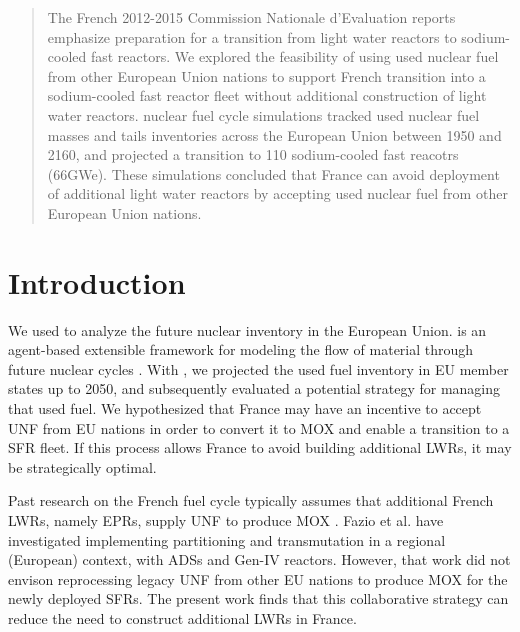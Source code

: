 \begin{abstract}
        The French 2012-2015 Commission Nationale d'Evaluation reports 
        \cite{noauthor_cne2_nodate} emphasize preparation for a transition from 
        light water reactors to sodium-cooled fast reactors.  We explored the 
        feasibility of using used nuclear fuel from other European Union 
        nations to support French transition into a sodium-cooled fast reactor 
        fleet without additional construction of light water reactors. \Cyclus 
        nuclear fuel cycle simulations tracked used nuclear fuel masses and tails 
        inventories across the European Union between 1950 and 2160, and 
        projected a transition to 110 sodium-cooled fast reacotrs (66GWe). 
        These simulations concluded that France can avoid deployment of 
        additional light water reactors by accepting used nuclear fuel from 
        other European Union nations.  
\end{abstract}

\section{Introduction}
We used \Cyclus to analyze
the future nuclear inventory in the European Union. \Cyclus is an agent-based extensible
framework for modeling the flow of material through future nuclear cycles \cite{huff_fundamental_2016}.
With \Cyclus, we projected the used fuel
inventory in \gls{EU} member states up to 2050, and subsequently evaluated a 
potential strategy for managing that used fuel.
We hypothesized that France may have an incentive
to accept \gls{UNF} from \gls{EU} nations in order to convert it to \gls{MOX} 
and enable a transition to a \gls{SFR} fleet. If this process allows France to 
avoid building additional \glspl{LWR}, it may be strategically optimal.

Past research on the French fuel cycle typically assumes that additional French \glspl{LWR},
namely \glspl{EPR}, supply \gls{UNF} to produce \gls{MOX} \cite{carre_overview_2009, martin_symbiotic_2017, freynet_multiobjective_2016}.
Fazio et al. have investigated implementing partitioning and transmutation
in a regional (European) context, with \glspl{ADS} and Gen-IV reactors\cite{fazio_study_2013}.
However, that work did not envison reprocessing legacy \gls{UNF} from other
\gls{EU} nations to produce \gls{MOX} for the newly deployed \glspl{SFR}.
The present work finds that this collaborative strategy can reduce the
need to construct additional \glspl{LWR} in France.

